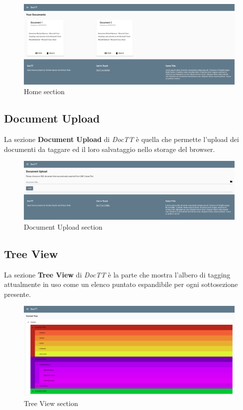 \documentclass[twoside]{supsistudent}
\begin{document}
\begin{figure}[h!]
  \includegraphics[width=\linewidth]{figures/home.png}
  \caption{Home section}
  \label{fig:home}
\end{figure}

\pagebreak

\subsection{Document Upload}
La sezione \textbf{Document Upload} di \textit{DocTT} è quella che permette
l'upload dei documenti da taggare ed il loro salvataggio nello storage del 
browser.

\begin{figure}[h!]
  \includegraphics[width=\linewidth]{figures/docUpload.png}
  \caption{Document Upload section}
  \label{fig:docUpload}
\end{figure}

\subsection{Tree View}
La sezione \textbf{Tree View} di \textit{DocTT} è la parte che mostra l'albero
di tagging attualmente in uso come un elenco puntato espandibile per ogni
sottosezione presente.

\begin{figure}[h!]
  \includegraphics[width=\linewidth]{figures/treeView.png}
  \caption{Tree View section}
  \label{fig:treeView}
\end{figure}
\end{document}
